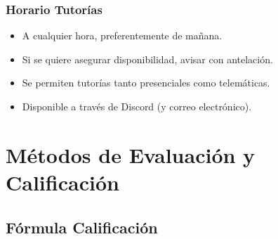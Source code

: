 \documentclass[handout,a4paper,t,xcolor=pst,colortheme]{beamer}
\begin{document}

\begin{frame}[c]
	\frametitle{Horario Tutorías}
	\begin{itemize}[<+->]
		\item A cualquier hora, preferentemente de mañana.
		\item Si se quiere asegurar disponibilidad, avisar con antelación.
		\item Se permiten tutorías tanto presenciales como telemáticas.
		\item Disponible a través de Discord (y correo electrónico).
	\end{itemize}
\end{frame}

\section{Métodos de Evaluación y Calificación}

\subsection{Fórmula Calificación}
\end{document}
